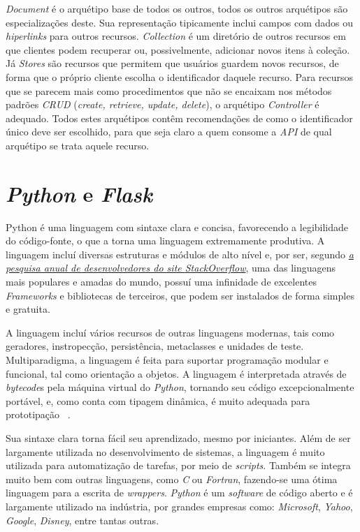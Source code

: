 \emph{Document} é o arquétipo base de todos os outros, todos os outros arquétipos são especializações 
deste. Sua representação tipicamente inclui campos com dados ou \emph{hiperlinks} para outros 
recursos. \emph{Collection} é um diretório de outros recursos em que clientes podem recuperar 
ou, possivelmente, adicionar novos itens à coleção. Já \emph{Stores} são recursos que permitem 
que usuários guardem novos recursos, de forma que o próprio cliente escolha o 
identificador daquele recurso. Para recursos que se parecem mais como procedimentos que 
não se encaixam nos métodos padrões \emph{CRUD} (\emph{create, retrieve, update, delete}),
  o arquétipo \emph{Controller} é adequado. Todos estes arquétipos 
  contêm recomendações de como o identificador único deve ser escolhido, para que seja 
  claro a quem consome a \emph{API} de qual arquétipo se trata aquele recurso.

  \section{\emph{Python} e \emph{Flask}}
  Python é uma linguagem com sintaxe clara e concisa, favorecendo a legibilidade do 
  código-fonte, o que a torna uma linguagem extremamente produtiva. A linguagem incluí 
  diversas estruturas e módulos de alto nível e, por ser,
  segundo \hyperref[link:exercism]{\emph{a pesquisa anual de desenvolvedores 
      do site \emph{StackOverflow}}},
  uma das linguagens mais populares e amadas do mundo, possuí uma infinidade 
  de excelentes \emph{Frameworks} e bibliotecas de terceiros, que podem ser instalados 
  de forma simples e gratuita. 

  A linguagem incluí vários recursos de outras linguagens 
  modernas, tais como geradores, instropecção, persistência, metaclasses e unidades de 
  teste. Multiparadigma,
  a linguagem é feita para suportar programação modular e funcional, 
  tal como orientação a objetos.
  A linguagem é interpretada através de 
  \emph{bytecode}s pela máquina virtual do \emph{Python}, tornando seu código 
  excepcionalmente portável, e, como conta com tipagem dinâmica, é muito adequada 
  para prototipação \ \cite{borges2014python}. 

  Sua sintaxe clara torna fácil seu aprendizado, mesmo por iniciantes. 
  Além de ser largamente utilizada no desenvolvimento de sistemas, a linguagem é muito utilizada 
  para automatização de tarefas, por meio de \emph{scripts}. Também se integra 
  muito bem com outras linguagens, como \emph{C} ou \emph{Fortran}, fazendo-se 
  uma ótima linguagem para a escrita de \emph{wrappers}. \emph{Python} é um 
  \emph{software} de código aberto e é largamente utilizado na indústria, 
  por grandes empresas como: \emph{Microsoft}, \emph{Yahoo}, \emph{Google}, \emph{Disney}, 
  entre tantas outras.

